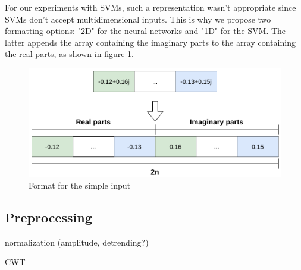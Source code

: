 For our experiments with SVMs, such a representation wasn't appropriate since SVMs don't accept multidimensional inputs. This is why we propose two formatting options: "2D" for the neural networks and "1D" for the SVM. The latter appends the array containing the imaginary parts to the array containing the real parts, as shown in figure \ref{fig:1din}.

\begin{figure}[htbp!]
  \centering
  \includegraphics[scale=0.75]{figures/dataprep_1d.png}
  \caption{Format for the simple input}
  \label{fig:1din}
\end{figure}

\subsection{Preprocessing}

normalization (amplitude, detrending?)

CWT
